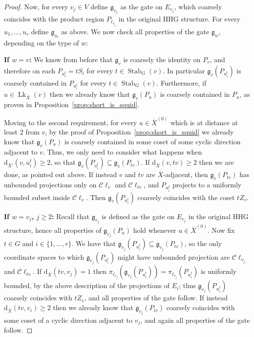 \documentclass[svgnames]{amsart}
\theoremstyle{plain}
\theoremstyle{definition}
\newcommand{\C}{\mathcal C}
\newcommand{\ov}[1]{\overline{#1}}
\newcommand{\dist}{\mathrm{d}}
\newcommand{\link}{\operatorname{Lk}}
\newcommand{\Stab}[2]{\operatorname{Stab}_{#1}(#2)}
\newcommand{\gate}{\mathfrak{g}}
\begin{document}
\begin{proof}
Now, for every $v_j\in V$ define $\gate_{v_j}$ as the gate on $E_{v_j}$, which coarsely coincides with the product region $P_{\ell_{v_j}}$ in the original HHG structure. For every $u_1,\ldots, u_r$ define $\gate_{u_i}$ as above. We now check all properties of the gate $\gate_w$, depending on the type of $w$:
\par\medskip
\textbf{If $w=v$:} We know from before that $\gate_{v}$ is coarsely the identity on $P_{v}$, and therefore on each $P_{u^t_i}=tS_i$ for every $t\in\Stab{G}{v}$. In particular $\gate_{v}(P_{u_i^t}) $ is coarsely contained in $P_{u_i^t}$ for every $t\in \Stab{G}{v}$. Furthermore, if $u\in\link_{\ov X}(v)$ then we already know that $\gate_v(P_u)$ is coarsely contained in $P_u$, as proven in Proposition~\ref{prop:short_is_squid}. 

Moving to the second requirement, for every $u\in\ov{X}^{(0)}$ which is at distance at least $2$ from $v$, by the proof of Proposition~\ref{prop:short_is_squid} we already know that $\gate_v(P_{u})$ is coarsely contained in some coset of some cyclic direction adjacent to $v$. Thus, we only need to consider what happens when $\dist_{\ov X'}(v, u^t_i)\ge 2$, so that $\gate_{v}(P_{u_i^t})\subseteq \gate_{v}(P_{tv})$. If $\dist_{\ov X}(v,tv)\ge 2$ then we are done, as pointed out above. If instead $v$ and $tv$ are $\ov X$-adjacent, then $\gate_{v}(P_{tv})$ has unbounded projections only on $\C\ell_v$ and $\C\ell_{tv}$, and $P_{u_i^t}$ projects to a uniformly bounded subset inside $\C\ell_v$. Then $\gate_{v}(P_{u_i^t})$ coarsely coincides with the coset $tZ_{v}$.


\par\medskip
\textbf{If $w=v_j$, $j\ge 2$:} Recall that $\gate_{v_j}$ is defined as the gate on $E_{v_j}$ in the original HHG structure, hence all properties of $\gate_{v_j}(P_u)$ hold whenever $u\in\ov{X}^{(0)}$. Now fix $t\in G$ and $i\in \{1,\ldots, r\}$. We have that $\gate_{v_j}(P_{u^t_i})\subseteq \gate_{v_j}(P_{tv})$, so the only coordinate spaces to which $\gate_{v_j}(P_{u^t_i})$ might have unbounded projection are $\C\ell_{v_j}$ and $\C\ell_{tv}$. If $\dist_{\ov X}(tv, v_j)=1$ then $\pi_{\ell_{v_j}}(\gate_{v_j}(P_{u^t_i}))=\pi_{\ell_{v_j}}(P_{u^t_i})$ is uniformly bounded, by the above description of the projections of $E_i$; thus $\gate_{v_j}(P_{u^t_i})$ coarsely coincides with $tZ_{v}$, and all properties of the gate follow. If instead $\dist_{\ov X}(tv, v_i)\ge 2$ then we already know that $\gate_{v_j}(P_{tv})$ coarsely coincides with some coset of a cyclic direction adjacent to $v_j$, and again all properties of the gate follow.




\end{proof}
\end{document}
